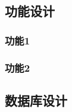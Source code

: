 \documentclass[twoside,11pt]{article}
\begin{document}
\subsection{功能设计}





\subsubsection{功能1}
\subsubsection{功能2}
\subsection{数据库设计}
\end{document}

